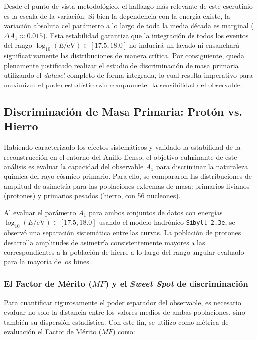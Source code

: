 Desde el punto de vista metodológico, el hallazgo más relevante de este escrutinio es la escala de la variación. Si bien la dependencia con la energía existe, la variación absoluta del parámetro a lo largo de toda la media década es marginal ($\Delta A_1 \approx 0.015$). Esta estabilidad garantiza que la integración de todos los eventos del rango $\log_{10}(E/\mathrm{eV}) \in [17.5, 18.0]$ no inducirá un lavado ni ensanchará significativamente las distribuciones de manera crítica. Por consiguiente, queda plenamente justificado realizar el estudio de discriminación de masa primaria utilizando el \textit{dataset} completo de forma integrada, lo cual resulta imperativo para maximizar el poder estadístico sin comprometer la sensibilidad del observable.

\subsection{Discriminación de Masa Primaria: Protón vs. Hierro}
\label{sec:discriminacion_masa}

Habiendo caracterizado los efectos sistemáticos y validado la estabilidad de la reconstrucción en el entorno del Anillo Denso, el objetivo culminante de este análisis es evaluar la capacidad del observable $A_1$ para discriminar la naturaleza química del rayo cósmico primario. Para ello, se compararon las distribuciones de amplitud de asimetría para las poblaciones extremas de masa: primarios livianos (protones) y primarios pesados (hierro, con 56 nucleones). 

Al evaluar el parámetro $A_1$ para ambos conjuntos de datos con energías $\log_{10}(E/\mathrm{eV}) \in [17.5, 18.0]$ usando el modelo hadrónico \texttt{Sibyll 2.3e}, se observó una separación sistemática entre las curvas. La población de protones desarrolla amplitudes de asimetría consistentemente mayores a las correspondientes a la población de hierro a lo largo del rango angular evaluado para la mayoría de los bines.

\subsubsection{El Factor de Mérito ($MF$) y el \textit{Sweet Spot} de discriminación}
\label{subsec:sweet_spot}

Para cuantificar rigurosamente el poder separador del observable, es necesario evaluar no solo la distancia entre los valores medios de ambas poblaciones, sino también su dispersión estadística. Con este fin, se utilizo como métrica de evaluación el Factor de Mérito ($MF$) como:

